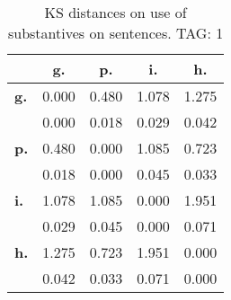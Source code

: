 \begin{table}[h!]
\begin{center}
\begin{tabular}{| l || c | c | c | c |}\hline
 & {\bf g.} & {\bf p.} & {\bf i.} & {\bf h.} \\\hline\hline
{\bf g.} & 0.000 & 0.480 & 1.078 & 1.275 \\
{\bf } & 0.000 & 0.018 & 0.029 & 0.042 \\\hline
{\bf p.} & 0.480 & 0.000 & 1.085 & 0.723 \\
{\bf } & 0.018 & 0.000 & 0.045 & 0.033 \\\hline
{\bf i.} & 1.078 & 1.085 & 0.000 & 1.951 \\
{\bf } & 0.029 & 0.045 & 0.000 & 0.071 \\\hline
{\bf h.} & 1.275 & 0.723 & 1.951 & 0.000 \\
{\bf } & 0.042 & 0.033 & 0.071 & 0.000 \\\hline
\end{tabular}
\caption{KS distances on use of substantives on sentences. TAG: 1}
\end{center}
\end{table}